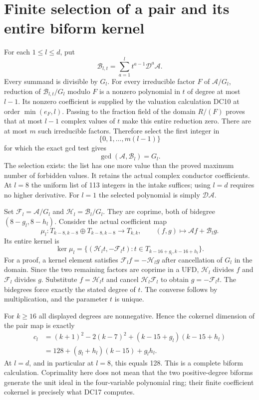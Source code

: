 \documentclass[11pt]{article}
\begin{document}
\section{Finite selection of a pair and its entire biform kernel}
For each $1\le l\le d$, put
\[
 \mathcal B_{l,t}=\sum_{a=1}^{l}t^{a-1}\mathcal D^a\mathcal A.
                                                                    \tag{DC13}
\]
Every summand is divisible by $G_l$.  For every irreducible factor
$F$ of $\mathcal A/G_l$, reduction of
$\mathcal B_{l,t}/G_l$ modulo $F$ is a nonzero polynomial in $t$ of
degree at most $l-1$.  Its nonzero coefficient is supplied by the
valuation calculation DC10 at order $\min(e_F,l)$.
Passing to the fraction field of the domain $R/(F)$ proves that
at most $l-1$ complex values of $t$ make this entire reduction zero.
There are at most $m$ such irreducible factors.  Therefore select the
first integer in
\[
 \{0,1,\ldots,m(l-1)\}
\]
for which the exact gcd test gives
\[
 \gcd(\mathcal A,\mathcal B_l)=G_l.                              \tag{DC14}
\]
The selection exists: the list has one more value than the proved
maximum number of forbidden values.  It retains the actual complex
conductor coefficients.  At $l=8$ the uniform list of 113 integers
in the intake suffices; using $l=d$ requires no higher derivative.
For $l=1$ the selected polynomial is simply $\mathcal D\mathcal A$.

Set $\mathcal F_l=\mathcal A/G_l$ and
$\mathcal H_l=\mathcal B_l/G_l$.  They are coprime, both of
bidegree $(8-g_l,8-h_l)$.  Consider the actual coefficient map
\[
 \mu_l:T_{k-8,k-8}\oplus T_{k-8,k-8}\longrightarrow T_{k,k},
 \qquad (f,g)\longmapsto\mathcal Af+\mathcal B_lg.                \tag{DC15}
\]
Its entire kernel is
\[
 \ker\mu_l=
 \{(\mathcal H_l t,-\mathcal F_l t):
                 t\in T_{k-16+g_l,k-16+h_l}\}.                  \tag{DC16}
\]
For a proof, a kernel element satisfies
$\mathcal F_l f=-\mathcal H_l g$ after cancellation of $G_l$ in
the domain.  Since the two remaining factors are coprime in a UFD,
$\mathcal H_l$ divides $f$ and $\mathcal F_l$ divides $g$.  Substitute
$f=\mathcal H_l t$ and cancel $\mathcal H_l\mathcal F_l$ to obtain
$g=-\mathcal F_l t$.  The bidegrees force exactly the stated degree
of $t$.  The converse follows by multiplication, and the parameter
$t$ is unique.

For $k\ge16$ all displayed degrees are nonnegative.  Hence the
cokernel dimension of the pair map is exactly
\[
 \begin{split}
 c_l&=(k+1)^2-2(k-7)^2
             +(k-15+g_l)(k-15+h_l)\\
    &=128+(g_l+h_l)(k-15)+g_lh_l.                                \end{split}\tag{DC17}
\]
At $l=d$, and in particular at $l=8$, this equals 128.  This is a
complete biform calculation.  Coprimality here does not mean that
the two positive-degree biforms generate the unit ideal in the
four-variable polynomial ring; their finite coefficient cokernel
is precisely what DC17 computes.
\end{document}
